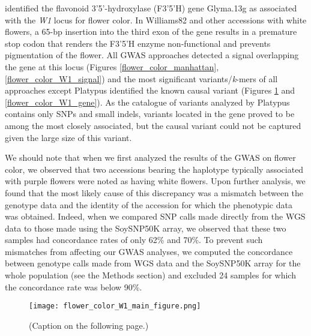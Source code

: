 \cite{zabala2007} identified the flavonoid 3’5’-hydroxylase (F3’5’H) gene
Glyma.13g as associated with the \textit{W1} locus for flower color. In
Williams82 and other accessions with white flowers, a 65-bp insertion into the
third exon of the gene results in a premature stop codon that renders the
F3’5’H enzyme non-functional and prevents pigmentation of the flower. All
GWAS approaches detected a signal overlapping the gene at this locus (Figures
\ref{flower_color_manhattan}, \ref{flower_color_W1_signal}) and the most
significant variants/\textit{k}-mers of all approaches except Platypus identified
the known causal variant (Figures \ref{flower-color-main-figure} and
\ref{flower_color_W1_gene}).
As the catalogue of variants analyzed by Platypus contains only SNPs and small
indels, variants located in the gene proved to be among the most closely
associated, but the causal variant could not be captured given the large size
of this variant.

We should note that when we first analyzed the results of the GWAS on flower
color, we observed that two accessions bearing the haplotype typically
associated with purple flowers were noted as having white flowers. Upon further
analysis, we found that the most likely cause of this discrepancy was a
mismatch between the genotype data and the identity of the accession for which
the phenotypic data was obtained. Indeed, when we compared SNP calls made
directly from the WGS data to those made using the SoySNP50K array, we observed
that these two samples had concordance rates of only 62\% and 70\%. To
prevent such mismatches from affecting our GWAS analyses, we computed the
concordance between genotype calls made from WGS data and the SoySNP50K array
for the whole population (see the Methods section) and
excluded 24 samples for which the concordance rate was below 90\%.

\begin{figure}
	\centering
	\texttt{[image: flower\_color\_W1\_main\_figure.png]}
	\caption[Results of SV- and \textit{k}-mer-based GWAS at the
	\textit{W1} locus for flower color]{(Caption on the following page.)}
	\label{flower-color-main-figure}
\end{figure}

